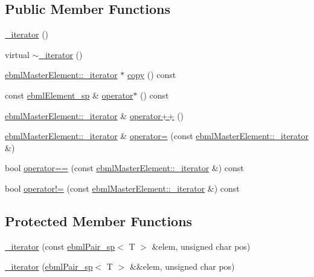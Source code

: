 \subsection*{Public Member Functions}
\begin{DoxyCompactItemize}
\item 
\mbox{\hyperlink{classebml_1_1ebmlPair_1_1__iterator_abbf56e96ab5f9bd6acb7b69a2efe2d38}{\+\_\+iterator}} ()
\item 
virtual \mbox{\hyperlink{classebml_1_1ebmlPair_1_1__iterator_a03a93396a9ebfae5a550f76eeaed0fb5}{$\sim$\+\_\+iterator}} ()
\item 
\mbox{\hyperlink{classebml_1_1ebmlMasterElement_1_1__iterator}{ebml\+Master\+Element\+::\+\_\+iterator}} $\ast$ \mbox{\hyperlink{classebml_1_1ebmlPair_1_1__iterator_a3f2945c8bbd6b161be18969c9a6ec260}{copy}} () const
\item 
const \mbox{\hyperlink{namespaceebml_adad533b7705a16bb360fe56380c5e7be}{ebml\+Element\+\_\+sp}} \& \mbox{\hyperlink{classebml_1_1ebmlPair_1_1__iterator_ae7f85d6a25b93280837766d206574604}{operator$\ast$}} () const
\item 
\mbox{\hyperlink{classebml_1_1ebmlMasterElement_1_1__iterator}{ebml\+Master\+Element\+::\+\_\+iterator}} \& \mbox{\hyperlink{classebml_1_1ebmlPair_1_1__iterator_a72dd1b1a818c44cc855f9340f3acbbe5}{operator++}} ()
\item 
\mbox{\hyperlink{classebml_1_1ebmlMasterElement_1_1__iterator}{ebml\+Master\+Element\+::\+\_\+iterator}} \& \mbox{\hyperlink{classebml_1_1ebmlPair_1_1__iterator_a2a77d98449db2fb4840d122f15da99be}{operator=}} (const \mbox{\hyperlink{classebml_1_1ebmlMasterElement_1_1__iterator}{ebml\+Master\+Element\+::\+\_\+iterator}} \&)
\item 
bool \mbox{\hyperlink{classebml_1_1ebmlPair_1_1__iterator_a82853adf042b58f9432861852b33ac64}{operator==}} (const \mbox{\hyperlink{classebml_1_1ebmlMasterElement_1_1__iterator}{ebml\+Master\+Element\+::\+\_\+iterator}} \&) const
\item 
bool \mbox{\hyperlink{classebml_1_1ebmlPair_1_1__iterator_a110f4b90bc4234c0e8f78160126e9baa}{operator!=}} (const \mbox{\hyperlink{classebml_1_1ebmlMasterElement_1_1__iterator}{ebml\+Master\+Element\+::\+\_\+iterator}} \&) const
\end{DoxyCompactItemize}
\subsection*{Protected Member Functions}
\begin{DoxyCompactItemize}
\item 
\mbox{\hyperlink{classebml_1_1ebmlPair_1_1__iterator_a857b4dbf1193d6f844780fd2a8a72f73}{\+\_\+iterator}} (const \mbox{\hyperlink{namespaceebml_a15439f6031c0f4ced33b9ab5e28af120}{ebml\+Pair\+\_\+sp}}$<$ T $>$ \&elem, unsigned char pos)
\item 
\mbox{\hyperlink{classebml_1_1ebmlPair_1_1__iterator_ae46c70f189bfe5ebb7859ce3175488bd}{\+\_\+iterator}} (\mbox{\hyperlink{namespaceebml_a15439f6031c0f4ced33b9ab5e28af120}{ebml\+Pair\+\_\+sp}}$<$ T $>$ \&\&elem, unsigned char pos)
\end{DoxyCompactItemize}
